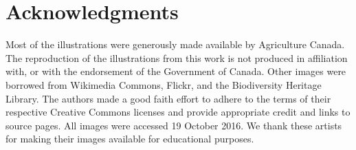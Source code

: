 \documentclass[letterpaper, 11pt]{article}
\begin{document}
\section*{Acknowledgments}
Most of the illustrations were generously made available by Agriculture Canada. The reproduction of the illustrations from this work is not produced in affiliation with, or with the endorsement of the Government of Canada. Other images were borrowed from Wikimedia Commons, Flickr, and the Biodiversity Heritage Library. The authors made a good faith effort to adhere to the terms of their respective Creative Commons licenses and provide appropriate credit and links to source pages. All images were accessed 19 October 2016. We thank these artists for making their images available for educational purposes.

\FloatBarrier


\end{document}
